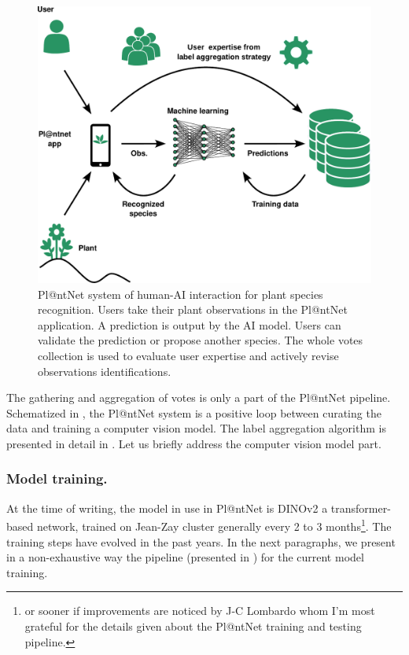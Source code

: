 \begin{figure}[thb]
        \centering
        \includegraphics[width=.65\linewidth]{./images_plantnet/plantnet_schema_global_green.pdf}
        \caption{Pl@ntNet system of human-AI interaction for plant species recognition. Users take their plant observations in the Pl@ntNet application. A prediction is output by the AI model. Users can validate the prediction or propose another species. The whole votes collection is used to evaluate user expertise and actively revise observations identifications.}
        \label{fig:plantnet-system}
    \end{figure}

The gathering and aggregation of votes is only a part of the Pl@ntNet pipeline.
Schematized in , the Pl@ntNet system is a positive loop between curating the data and training a computer vision model.
The label aggregation algorithm is presented in detail in .
Let us briefly address the computer vision model part.

\subsubsection{Model training.}

At the time of writing, the model in use in Pl@ntNet is DINOv2 \citep{oquab2024dinov2} a transformer-based network, trained on Jean-Zay cluster generally every 2 to 3 months\footnote{or sooner if improvements are noticed by J-C Lombardo whom I'm most grateful for the details given about the Pl@ntNet training and testing pipeline.}.
The training steps have evolved in the past years.
In the next paragraphs, we present in a non-exhaustive way the pipeline (presented in ) for the current model training.

